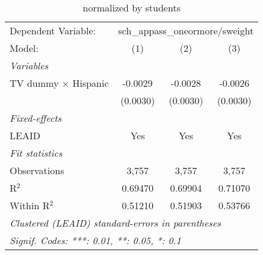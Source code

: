 \begin{table}[htbp]
\centering
\caption{ normalized by students}
\begin{tabular}{lccc}
\tabularnewline\midrule\midrule
Dependent Variable:&\multicolumn{3}{c}{sch\_appass\_oneormore/sweight}\\
Model:&(1) & (2) & (3)\\
\midrule \emph{Variables}&   &   &  \\
TV dummy $\times$ Hispanic & -0.0029 & -0.0028 & -0.0026\\
  &(0.0030) & (0.0030) & (0.0030)\\
\midrule \emph{Fixed-effects}&   &   &  \\
LEAID & Yes & Yes & Yes\\
\midrule \emph{Fit statistics}&  & & \\
Observations & 3,757&3,757&3,757\\
R$^2$ & 0.69470&0.69904&0.71070\\
Within R$^2$ & 0.51210&0.51903&0.53766\\
\midrule\midrule\multicolumn{4}{l}{\emph{Clustered (LEAID) standard-errors in parentheses}}\\
\multicolumn{4}{l}{\emph{Signif. Codes: ***: 0.01, **: 0.05, *: 0.1}}\\
\end{tabular}
\end{table}

